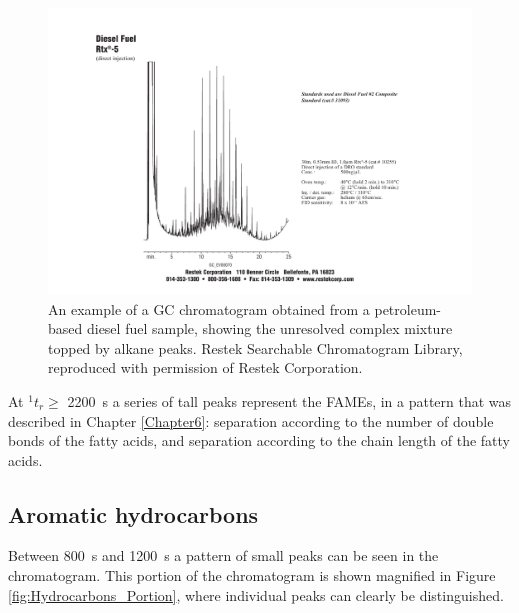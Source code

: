 \begin{figure}
	\centering
	\includegraphics[width=\textwidth]{Figures/hchump.pdf}
	\decoRule	
	
\caption[An example of a petrochemical fuel chromatogram.]{An example of a GC
chromatogram obtained from a petroleum-based diesel fuel sample, showing the
unresolved complex mixture topped by alkane peaks. Restek Searchable
Chromatogram Library, reproduced with permission of Restek Corporation.}
	
	\label{fig:HCHump} 
\end{figure}

At \(^{1}t_{r} \geq \) \SI{2200}{\second} a series of tall peaks represent the
FAMEs, in a pattern that was described in Chapter \ref{Chapter6}: \oneD
separation according to the number of double bonds of the fatty acids, and \twoD
separation according to the chain length of the fatty acids.


\subsection{Aromatic hydrocarbons}

Between \SI{800}{\second} and \SI{1200}{\second} a pattern of small peaks can be
seen in the chromatogram. This portion of the chromatogram is shown magnified in
Figure \ref{fig:Hydrocarbons_Portion}, where individual peaks can clearly be
distinguished.

